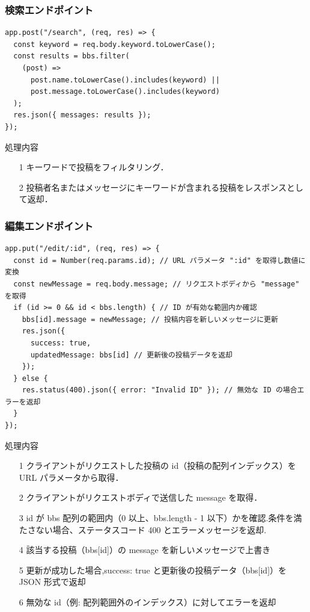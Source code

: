 \documentclass[uplatex,dvipdfmx]{jsarticle}
\begin{document}
\subsubsection{検索エンドポイント}
\begin{lstlisting}[label=e]
app.post("/search", (req, res) => {
  const keyword = req.body.keyword.toLowerCase();
  const results = bbs.filter(
    (post) =>
      post.name.toLowerCase().includes(keyword) ||
      post.message.toLowerCase().includes(keyword)
  );
  res.json({ messages: results });
});
\end{lstlisting}

\begin{itembox}[c]{処理内容}
    \begin{enumerate}
        \setlength{\leftskip}{0pt}
        \item[1]キーワードで投稿をフィルタリング．
        \item[2]投稿者名またはメッセージにキーワードが含まれる投稿をレスポンスとして返却．
    \end{enumerate}
\end{itembox}


\subsubsection{ 編集エンドポイント}
\begin{lstlisting}[label=f]
app.put("/edit/:id", (req, res) => {
  const id = Number(req.params.id); // URL パラメータ ":id" を取得し数値に変換
  const newMessage = req.body.message; // リクエストボディから "message" を取得
  if (id >= 0 && id < bbs.length) { // ID が有効な範囲内か確認
    bbs[id].message = newMessage; // 投稿内容を新しいメッセージに更新
    res.json({ 
      success: true, 
      updatedMessage: bbs[id] // 更新後の投稿データを返却
    });
  } else {
    res.status(400).json({ error: "Invalid ID" }); // 無効な ID の場合エラーを返却
  }
});
\end{lstlisting}

\begin{itembox}[c]{処理内容}
    \begin{enumerate}
        \setlength{\leftskip}{0pt}
        \item[1]クライアントがリクエストした投稿の id（投稿の配列インデックス）を URL パラメータから取得．
        \item[2]クライアントがリクエストボディで送信した message を取得．
        \item[3]id が bbs 配列の範囲内（0 以上、bbs.length - 1 以下）かを確認.条件を満たさない場合、ステータスコード 400 とエラーメッセージを返却.
        \item[4]該当する投稿（bbs[id]）の message を新しいメッセージで上書き
        \item[5]更新が成功した場合,success: true と更新後の投稿データ（bbs[id]）を JSON 形式で返却
        \item[6]無効な id（例: 配列範囲外のインデックス）に対してエラーを返却
    \end{enumerate}
\end{itembox}
\end{document}
